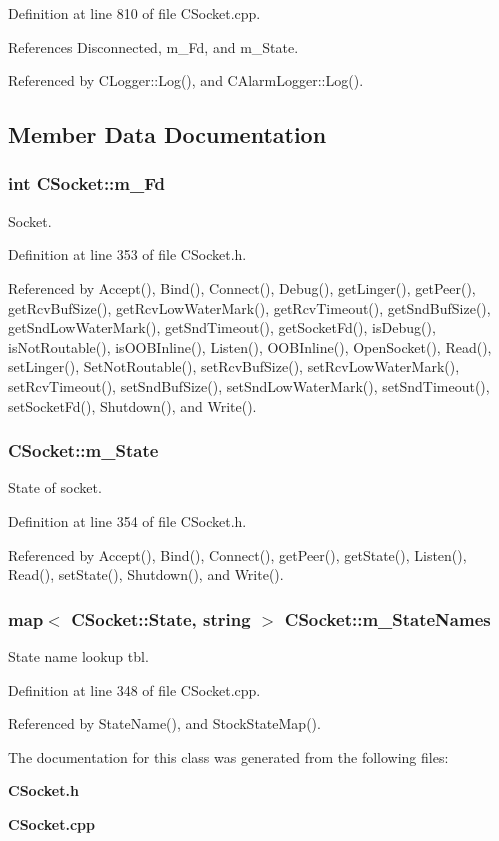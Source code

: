 Definition at line 810 of file CSocket.cpp.

References Disconnected, m\_\-Fd, and m\_\-State.

Referenced by CLogger::Log(), and CAlarm\-Logger::Log().

\subsection{Member Data Documentation}
\subsubsection{\setlength{\rightskip}{0pt plus 5cm}int CSocket::m\_\-Fd\hspace{0.3cm}{\tt  [private]}}\label{classCSocket_o0}


Socket.



Definition at line 353 of file CSocket.h.

Referenced by Accept(), Bind(), Connect(), Debug(), get\-Linger(), get\-Peer(), get\-Rcv\-Buf\-Size(), get\-Rcv\-Low\-Water\-Mark(), get\-Rcv\-Timeout(), get\-Snd\-Buf\-Size(), get\-Snd\-Low\-Water\-Mark(), get\-Snd\-Timeout(), get\-Socket\-Fd(), is\-Debug(), is\-Not\-Routable(), is\-OOBInline(), Listen(), OOBInline(), Open\-Socket(), Read(), set\-Linger(), Set\-Not\-Routable(), set\-Rcv\-Buf\-Size(), set\-Rcv\-Low\-Water\-Mark(), set\-Rcv\-Timeout(), set\-Snd\-Buf\-Size(), set\-Snd\-Low\-Water\-Mark(), set\-Snd\-Timeout(), set\-Socket\-Fd(), Shutdown(), and Write().
\subsubsection{ CSocket::m\_\-State\hspace{0.3cm}{\tt  [private]}}\label{classCSocket_o1}


State of socket.



Definition at line 354 of file CSocket.h.

Referenced by Accept(), Bind(), Connect(), get\-Peer(), get\-State(), Listen(), Read(), set\-State(), Shutdown(), and Write().
\subsubsection{\setlength{\rightskip}{0pt plus 5cm}map$<$ {\bf CSocket::State}, string $>$ CSocket::m\_\-State\-Names\hspace{0.3cm}{\tt  [static, private]}}\label{classCSocket_r0}


State name lookup tbl.



Definition at line 348 of file CSocket.cpp.

Referenced by State\-Name(), and Stock\-State\-Map().

The documentation for this class was generated from the following files:\begin{CompactItemize}
\item 
{\bf CSocket.h}\item 
{\bf CSocket.cpp}\end{CompactItemize}
